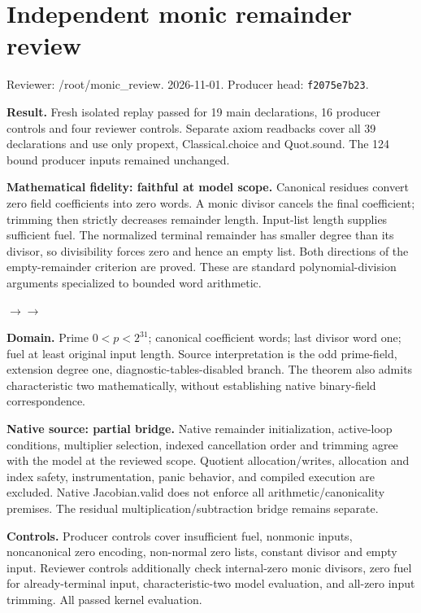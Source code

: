 \documentclass[10pt]{article}
\begin{document}
\section*{Independent monic remainder review}
Reviewer: /root/monic\_review. 2026-11-01. Producer head: \texttt{f2075e7b23}.

\textbf{Result.} Fresh isolated replay passed for 19 main declarations, 16 producer controls and four reviewer controls. Separate axiom readbacks cover all 39 declarations and use only propext, Classical.choice and Quot.sound. The 124 bound producer inputs remained unchanged.

\textbf{Mathematical fidelity: faithful at model scope.} Canonical residues convert zero field coefficients into zero words. A monic divisor cancels the final coefficient; trimming then strictly decreases remainder length. Input-list length supplies sufficient fuel. The normalized terminal remainder has smaller degree than its divisor, so divisibility forces zero and hence an empty list. Both directions of the empty-remainder criterion are proved. These are standard polynomial-division arguments specialized to bounded word arithmetic.

\begin{center}\quad$\longrightarrow$\quad{}\quad$\longrightarrow$\quad{}\end{center}

\textbf{Domain.} Prime $0<p<2^{31}$; canonical coefficient words; last divisor word one; fuel at least original input length. Source interpretation is the odd prime-field, extension degree one, diagnostic-tables-disabled branch. The theorem also admits characteristic two mathematically, without establishing native binary-field correspondence.

\textbf{Native source: partial bridge.} Native remainder initialization, active-loop conditions, multiplier selection, indexed cancellation order and trimming agree with the model at the reviewed scope. Quotient allocation/writes, allocation and index safety, instrumentation, panic behavior, and compiled execution are excluded. Native Jacobian.valid does not enforce all arithmetic/canonicality premises. The residual multiplication/subtraction bridge remains separate.

\textbf{Controls.} Producer controls cover insufficient fuel, nonmonic inputs, noncanonical zero encoding, non-normal zero lists, constant divisor and empty input. Reviewer controls additionally check internal-zero monic divisors, zero fuel for already-terminal input, characteristic-two model evaluation, and all-zero input trimming. All passed kernel evaluation.
\end{document}
